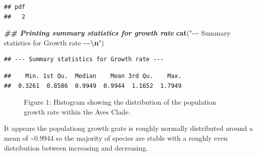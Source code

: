 \documentclass[
]{article}
\newenvironment{Shaded}{\begin{snugshade}}{\end{snugshade}}
\newcommand{\ConstantTok}[1]{\textcolor[rgb]{0.56,0.35,0.01}{#1}}
\newcommand{\DecValTok}[1]{\textcolor[rgb]{0.00,0.00,0.81}{#1}}
\newcommand{\DocumentationTok}[1]{\textcolor[rgb]{0.56,0.35,0.01}{\textbf{\textit{#1}}}}
\newcommand{\FunctionTok}[1]{\textcolor[rgb]{0.13,0.29,0.53}{\textbf{#1}}}
\newcommand{\NormalTok}[1]{#1}
\newcommand{\SpecialCharTok}[1]{\textcolor[rgb]{0.81,0.36,0.00}{\textbf{#1}}}
\newcommand{\StringTok}[1]{\textcolor[rgb]{0.31,0.60,0.02}{#1}}
\begin{document}
\begin{verbatim}
## pdf 
##   2
\end{verbatim}

\begin{Shaded}
\begin{Highlighting}[]
\DocumentationTok{\#\# Printing summary statistics for growth rate}
\FunctionTok{cat}\NormalTok{(}\StringTok{"{-}{-}{-} Summary statistics for Growth rate {-}{-}{-}}\SpecialCharTok{\textbackslash{}n}\StringTok{"}\NormalTok{)}
\end{Highlighting}
\end{Shaded}

\begin{verbatim}
## --- Summary statistics for Growth rate ---
\end{verbatim}

\begin{Shaded}
\end{Shaded}

\begin{verbatim}
##    Min. 1st Qu.  Median    Mean 3rd Qu.    Max. 
##  0.3261  0.8586  0.9949  0.9944  1.1652  1.7949
\end{verbatim}

\begin{figure}
\centering

\caption{Figure 1: Histogram showing the distribution of the population
growth rate within the Aves Clade.}
\end{figure}

It appears the populationg growth grate is roughly normally distributed
around a mean of \textasciitilde0.9944 so the majority of species are
stable with a roughly even distribution between increasing and
decreasing.

\begin{Shaded}
\end{Shaded}
\end{document}
